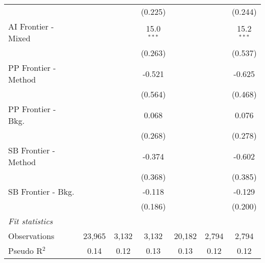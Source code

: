 \begin{tabular}{lcccccc}
                        &                &         & (0.225)       &               &              & (0.244)\\   
   AI Frontier - Mixed  &                &         & 15.0$^{***}$  &               &              & 15.2$^{***}$\\   
                        &                &         & (0.263)       &               &              & (0.537)\\   
   PP Frontier - Method &                &         & -0.521        &               &              & -0.625\\   
                        &                &         & (0.564)       &               &              & (0.468)\\   
   PP Frontier - Bkg.   &                &         & 0.068         &               &              & 0.076\\   
                        &                &         & (0.268)       &               &              & (0.278)\\   
   SB Frontier - Method &                &         & -0.374        &               &              & -0.602\\   
                        &                &         & (0.368)       &               &              & (0.385)\\   
   SB Frontier - Bkg.   &                &         & -0.118        &               &              & -0.129\\   
                        &                &         & (0.186)       &               &              & (0.200)\\   
   \midrule
   \emph{Fit statistics}\\
   Observations         & 23,965         & 3,132   & 3,132         & 20,182        & 2,794        & 2,794\\  
   Pseudo R$^2$         & 0.14           & 0.12    & 0.13          & 0.13          & 0.12         & 0.12\\  
   

\end{tabular}

